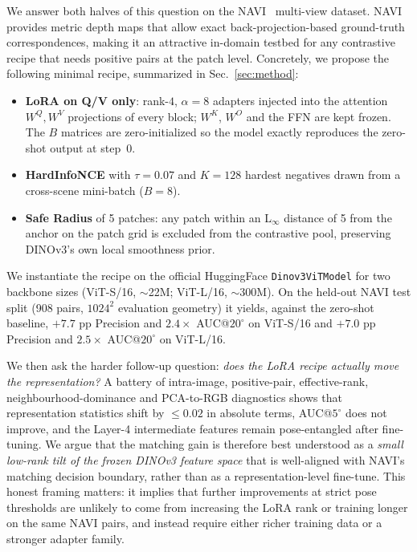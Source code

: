 \documentclass[10pt,twocolumn,letterpaper]{article}
\begin{document}
We answer both halves of this question on the NAVI~\cite{navi}
multi-view dataset. NAVI provides metric depth maps that allow exact
back-projection-based ground-truth correspondences, making it an
attractive in-domain testbed for any contrastive recipe that needs
positive pairs at the patch level. Concretely, we propose the
following minimal recipe, summarized in
Sec.~\ref{sec:method}:
\begin{itemize}
\item \textbf{LoRA on Q/V only}: rank-$4$, $\alpha=8$ adapters injected
into the attention $W^Q, W^V$ projections of every block; $W^K$, $W^O$
and the FFN are kept frozen. The $B$ matrices are zero-initialized so
the model exactly reproduces the zero-shot output at step~$0$.
\item \textbf{HardInfoNCE} with $\tau=0.07$ and $K=128$ hardest
negatives drawn from a cross-scene mini-batch ($B=8$).
\item \textbf{Safe Radius} of 5 patches: any patch within an L$_\infty$
distance of 5 from the anchor on the patch grid is excluded from the
contrastive pool, preserving DINOv3's own local smoothness prior.
\end{itemize}

We instantiate the recipe on the official HuggingFace
\texttt{Dinov3ViTModel} for two backbone sizes (ViT-S/16, $\sim$22M;
ViT-L/16, $\sim$300M). On the held-out NAVI test split (908 pairs,
$1024^2$ evaluation geometry) it yields, against the zero-shot baseline,
$+7.7$ pp Precision and $2.4\times$ AUC@$20^\circ$ on ViT-S/16 and
$+7.0$ pp Precision and $2.5\times$ AUC@$20^\circ$ on ViT-L/16.

We then ask the harder follow-up question: \emph{does the LoRA recipe
actually move the representation?} A battery of intra-image,
positive-pair, effective-rank, neighbourhood-dominance and PCA-to-RGB
diagnostics shows that representation statistics shift by $\le 0.02$ in
absolute terms, AUC@$5^\circ$ does not improve, and the Layer-4
intermediate features remain pose-entangled after fine-tuning. We argue
that the matching gain is therefore best understood as a \emph{small
low-rank tilt of the frozen DINOv3 feature space} that is
well-aligned with NAVI's matching decision boundary, rather than as
a representation-level fine-tune. This honest framing matters: it
implies that further improvements at strict pose thresholds are
unlikely to come from increasing the LoRA rank or training longer on
the same NAVI pairs, and instead require either richer training data
or a stronger adapter family.
\end{document}
